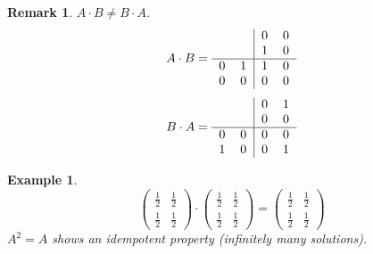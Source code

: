 \documentclass[a4paper,landscape,twocolumn]{article}
\newtheorem{ex}{Example}
\newtheorem{rem}{Remark}
\begin{document}
\begin{rem}
  $A \cdot B \neq B \cdot A$.
  \[
    A\cdot B = \begin{tabular}{cc|cc}
       & & 0 & 0 \\
       & & 1 & 0 \\
      \hline
       0 & 1 & 1 & 0 \\
       0 & 0 & 0 & 0
    \end{tabular}
  \]
  \[
    B\cdot A = \begin{tabular}{cc|cc}
       & & 0 & 1 \\
       & & 0 & 0 \\
      \hline
       0 & 0 & 0 & 0 \\
       1 & 0 & 0 & 1
    \end{tabular}
  \]
\end{rem}
\begin{ex}
  \[
    \begin{pmatrix}
      \frac12 & \frac12 \\
      \frac12 & \frac12
    \end{pmatrix} \cdot
    \begin{pmatrix}
      \frac12 & \frac12 \\
      \frac12 & \frac12
    \end{pmatrix} =
    \begin{pmatrix}
      \frac12 & \frac12 \\
      \frac12 & \frac12
    \end{pmatrix}
  \]
  $A^2 = A$ shows an idempotent property (infinitely many solutions).
\end{ex}
\end{document}
